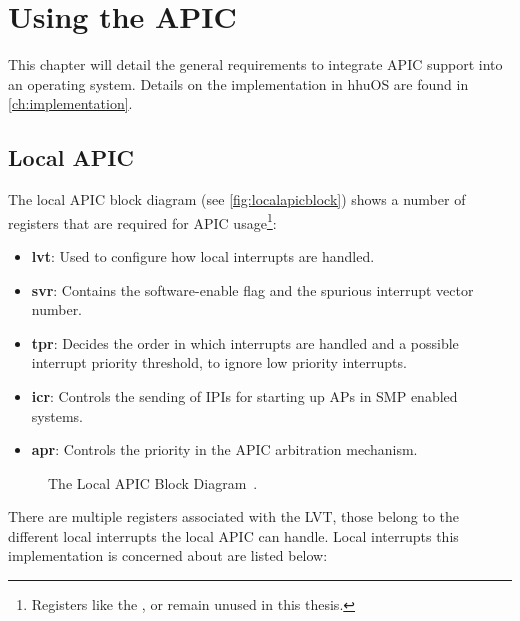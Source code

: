\chapter{Using the APIC}
\label{ch:interrupthandling}

This chapter will detail the general requirements to integrate APIC support into an operating system.
Details on the implementation in hhuOS are found in \autoref{ch:implementation}.

\clearpage

\section{Local APIC}
\label{sec:lapicinit}

The local APIC block diagram (see \autoref{fig:localapicblock}) shows a number of registers that are required for APIC usage\footnote{
  Registers like the ,  or  remain unused in this thesis.}:

\begin{itemize}
  \item \textbf{\gls{lvt}}: Used to configure how local interrupts are handled.
  \item \textbf{\gls{svr}}: Contains the software-enable flag and the spurious interrupt vector number.
  \item \textbf{\gls{tpr}}: Decides the order in which interrupts are handled and a possible interrupt priority threshold, to ignore low priority interrupts.
  \item \textbf{\gls{icr}}: Controls the sending of IPIs for starting up APs in SMP enabled systems.
  \item \textbf{\gls{apr}}: Controls the priority in the APIC arbitration mechanism.
\end{itemize}

\begin{figure}[h]
  \centering
  \begin{subfigure}[b]{0.9\textwidth}
    
  \end{subfigure}
  \caption{The Local APIC Block Diagram~\autocite[sec.~3.11.4.1]{ia32}.}
  \label{fig:localapicblock}
\end{figure}

There are multiple registers associated with the LVT, those belong to the different local interrupts the local APIC can handle.
Local interrupts this implementation is concerned about are listed below:


